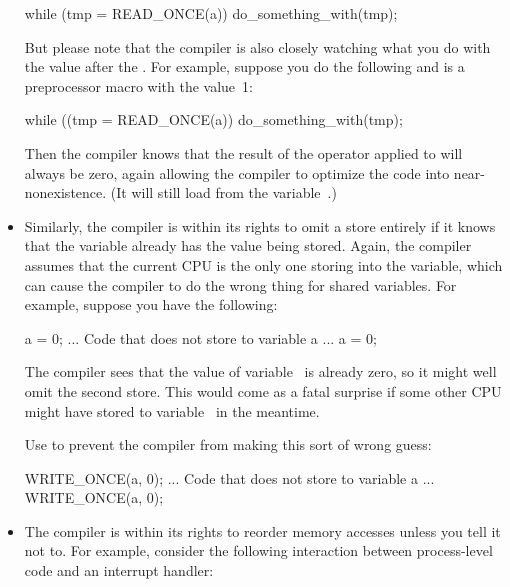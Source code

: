 \begin{itemize}
\begin{VerbatimU}
	while (tmp = READ_ONCE(a))
		do_something_with(tmp);
\end{VerbatimU}

     But please note that the compiler is also closely watching what you
     do with the value after the .
     For example, suppose you do the following and  is a preprocessor
     macro with the value~1:

\begin{VerbatimU}
	while ((tmp = READ_ONCE(a)) %
		do_something_with(tmp);
\end{VerbatimU}

     Then the compiler knows that the result of the \qco{\%} operator applied
     to  will always be zero, again allowing the compiler to optimize
     the code into near-nonexistence.
     (It will still load from the variable~.)

 \item
     Similarly, the compiler is within its rights to omit a store entirely
     if it knows that the variable already has the value being stored.
     Again, the compiler assumes that the current CPU is the only one
     storing into the variable, which can cause the compiler to do the
     wrong thing for shared variables.
     For example, suppose you have the following:

\begin{VerbatimU}
	a = 0;
	... Code that does not store to variable a ...
	a = 0;
\end{VerbatimU}

     The compiler sees that the value of variable~ is already zero, so
     it might well omit the second store.
     This would come as a fatal surprise if some other CPU might have
     stored to variable~ in the meantime.

     Use  to prevent the compiler from making this sort of
     wrong guess:

\begin{VerbatimU}
	WRITE_ONCE(a, 0);
	... Code that does not store to variable a ...
	WRITE_ONCE(a, 0);
\end{VerbatimU}

\item
     The compiler is within its rights to reorder memory accesses unless
     you tell it not to.
     For example, consider the following interaction between process-level
     code and an interrupt handler:


\end{itemize}
